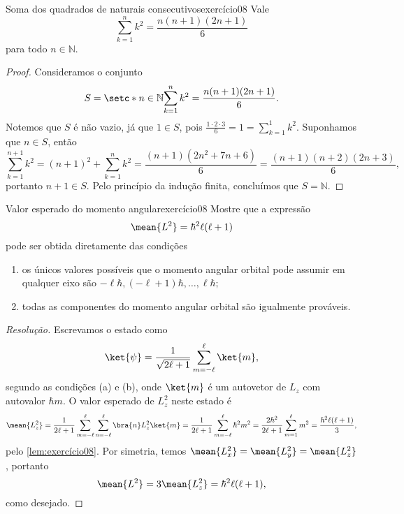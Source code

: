 \begin{lemma}{Soma dos quadrados de naturais consecutivos}{exercício08}
    Vale
    \begin{equation*}
        \sum_{k = 1}^n k^2 = \frac{n(n+1)(2n+1)}{6}
    \end{equation*}
    para todo \(n \in \mathbb{N}\).
\end{lemma}
\begin{proof}
    Consideramos o conjunto
    \begin{equation*}
        S = \setc*{n \in \mathbb{N}}{\sum_{k = 1}^n k^2 = \frac{n(n+1)(2n+1)}{6}}.
    \end{equation*}
    Notemos que \(S\) é não vazio, já que \(1 \in S\), pois \(\frac{1 \cdot 2 \cdot 3}{6} = 1 = \sum_{k = 1}^1 k^2\). Suponhamos que \(n \in S\), então
    \begin{equation*}
        \sum_{k = 1}^{n+1} k^2 = (n+1)^2 + \sum_{k= 1}^n k^2 = \frac{(n+1)(2n^2 + 7n + 6)}{6} = \frac{(n+1)(n + 2)(2n + 3)}{6},
    \end{equation*}
    portanto \(n + 1 \in S\). Pelo princípio da indução finita, concluímos que \(S = \mathbb{N}\).
\end{proof}
\begin{exercício}{Valor esperado do momento angular}{exercício08}
    Mostre que a expressão
    \begin{equation*}
        \mean{L^2} = \hbar^2 \ell(\ell + 1)
    \end{equation*}
    pode ser obtida diretamente das condições
    \begin{enumerate}[label=(\alph*)]
        \item os únicos valores possíveis que o momento angular orbital pode assumir em qualquer eixo são \(- \ell \hbar, (-\ell + 1)\hbar, \dots, \ell\hbar;\)
        \item todas as componentes do momento angular orbital são igualmente prováveis.
    \end{enumerate}
\end{exercício}
\begin{proof}[Resolução]
    Escrevamos o estado como
    \begin{equation*}
        \ket{\psi} = \frac{1}{\sqrt{2\ell + 1}}\sum_{m = -\ell}^\ell \ket{m},
    \end{equation*}
    segundo as condições (a) e (b), onde \(\ket{m}\) é um autovetor de \(L_z\) com autovalor \(\hbar m\). O valor esperado de \(L_z^2\) neste estado é
    \begin{equation*}
        \mean{L_z^2} = \frac{1}{2\ell + 1} \sum_{m = -\ell}^\ell \sum_{n = -\ell}^\ell\bra{n}L_z^2 \ket{m} = \frac{1}{2\ell + 1} \sum_{m = -\ell}^\ell \hbar^2 m^2 = \frac{2\hbar^2}{2\ell + 1}\sum_{m = 1}^\ell m^2 = \frac{\hbar^2 \ell (\ell + 1)}{3},
    \end{equation*}
    pelo \cref{lem:exercício08}. Por simetria, temos \(\mean{L_x^2} = \mean{L_y^2} = \mean{L_z^2}\), portanto
    \begin{equation*}
        \mean{L^2} = 3\mean{L_z^2} = \hbar^2 \ell (\ell + 1),
    \end{equation*}
    como desejado.
\end{proof}
